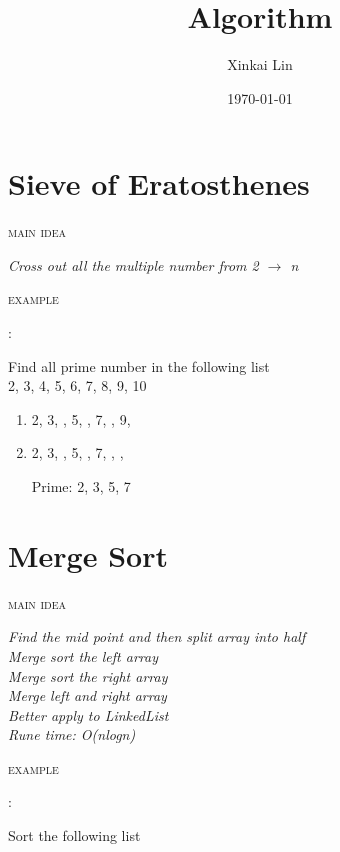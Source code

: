 \documentclass[12pt, letterpaper]{article}
\renewcommand{\maketitle}{
\begin{center}
{\Huge\bfseries
\thetitle}
\end{center}}
\newcommand{\idea}[1]{
\noindent
\begin{minipage}[t]{0.15\textwidth}
	\textsc{main idea}
\end{minipage}
\hspace{-0.8cm}\vline\hspace{0.05cm}
\begin{minipage}[t]{0.88\textwidth}
	\textit{#1}
\end{minipage}\vspace{0.25cm}}
\newcommand{\example}[1]{
\noindent
\begin{minipage}[t]{0.02\textwidth}
	\textsc{example}
\end{minipage}
\hspace{1.6cm}:\hspace{0.05cm}
\begin{minipage}[t]{0.88\textwidth}
	\textnormal{#1}
\end{minipage}\vspace{0.25cm}}
\begin{document}
\title{Algorithm}
\author{Xinkai Lin}
\date{\today}

\maketitle

\section{Sieve of Eratosthenes}
\idea{Cross out all the multiple number from 2 $\rightarrow$ n}
\example{Find all prime number in the following list \\ 
		 2, 3, 4, 5, 6, 7, 8, 9, 10}

\begin{minipage}{0.9\textwidth}
	\begin{enumerate}[Step 1:]
		\item 2, 3, , 5, , 7, , 9, 
		\item 2, 3, , 5, , 7, , , 
		
		\hspace{-1.5cm}Prime\hspace{0.09cm}: 2, 3, 5, 7
	\end{enumerate}
\end{minipage}
\vfill

\section{Merge Sort}
\idea{Find the mid point and then split array into half\\
	  Merge sort the left array\\
	  Merge sort the right array\\
	  Merge left and right array\\
	  Better apply to LinkedList\\
	  Rune time: O(nlogn)}
\example{Sort the following list}
\end{document}
